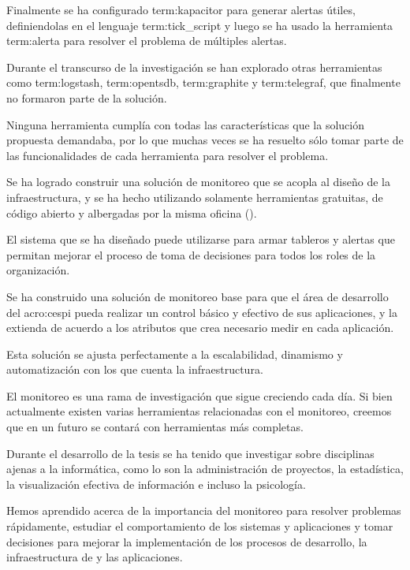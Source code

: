 Finalmente se ha configurado \gls{term:kapacitor} para generar alertas útiles,
definiendolas en el lenguaje \gls{term:tick_script} y luego se ha usado la
herramienta \gls{term:alerta} para resolver el problema de múltiples alertas.

Durante el transcurso de la investigación se han explorado otras
herramientas como \gls{term:logstash}, \gls{term:opentsdb}, \gls{term:graphite}
y \gls{term:telegraf}, que finalmente no formaron parte de la solución.

Ninguna herramienta cumplía con todas las características que la solución
propuesta demandaba, por lo que muchas veces se ha resuelto sólo tomar parte de
las funcionalidades de cada herramienta para resolver el problema.

Se ha logrado construir una solución de monitoreo que se acopla al diseño de la
infraestructura, y se ha hecho utilizando solamente herramientas gratuitas,
de código abierto y albergadas por la misma oficina ().

El sistema que se ha diseñado puede utilizarse para armar tableros y alertas
que permitan mejorar el proceso de toma de decisiones para todos los roles de
la organización.

Se ha construido una solución de monitoreo base para que el
área de desarrollo del \gls{acro:cespi} pueda realizar un control básico y
efectivo de sus aplicaciones, y la extienda de acuerdo a los atributos que crea
necesario medir en cada aplicación.

Esta solución se ajusta perfectamente a la escalabilidad, dinamismo
y automatización con los que cuenta la infraestructura.

El monitoreo es una rama de investigación que sigue creciendo cada día. Si bien
actualmente existen varias herramientas relacionadas con el monitoreo, creemos
que en un futuro se contará con herramientas más completas.

Durante el desarrollo de la tesis se ha tenido que investigar sobre disciplinas
ajenas a la informática, como lo son la administración de proyectos, la
estadística, la visualización efectiva de información e incluso la psicología.

Hemos aprendido acerca de la importancia del monitoreo para resolver problemas
rápidamente, estudiar el comportamiento de los sistemas y aplicaciones y tomar
decisiones para mejorar la implementación de los procesos de desarrollo, la
infraestructura de  y las aplicaciones.
